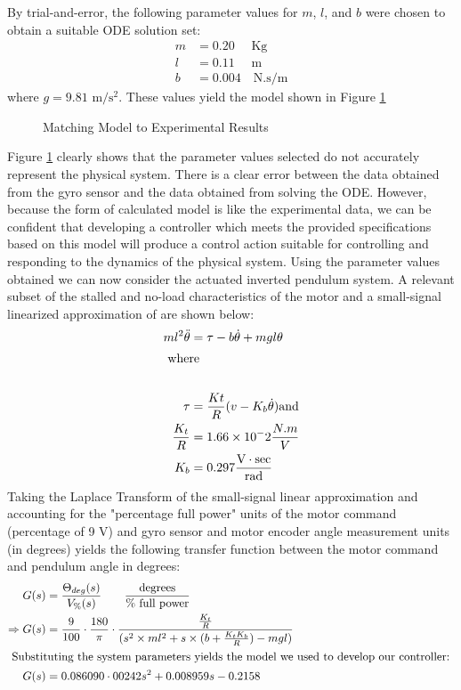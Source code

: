 \documentclass[11pt, a4paper,twocolumn]{article}
\begin{document}
By trial-and-error, the following parameter values for $m$, $l$, and $b$ were chosen to obtain a suitable ODE solution set:
\begin{align*}
	m &= 0.20\quad \text{ Kg}\\
	l &= 0.11\quad \text{ m}\\
	b &= 0.004\quad \text{N.s/m}
\end{align*}
where $ g = 9.81 \text{ m}/\text{s}^2 $. These values yield the model shown in Figure \ref{fig:damping_match}
\begin{figure}[hb!]
\centering
\caption{Matching Model to Experimental Results}
\label{fig:damping_match}
\end{figure}
	Figure \ref{fig:damping_match} clearly shows that the parameter values selected do not accurately represent the physical system. There is a clear error between the data obtained from the gyro sensor and the data obtained from solving the ODE. However, because the form of calculated model is like the experimental data, we can be confident that developing a controller which meets the provided specifications based on this model will produce a control action suitable for controlling and responding to the dynamics of the physical system.
Using the parameter values obtained we can now consider the actuated inverted pendulum system. A relevant subset of the stalled and no-load characteristics of the motor and a small-signal linearized approximation of are shown below:
%
\begin{align*}
	ml^2\ddot{\theta} &= \tau - b\dot{\theta} + mgl\theta \\
	\intertext{ where }	\\
	\tau &= \frac{Kt}{R}(v - K_b\dot{\theta}) \text{and}	\\
	\frac{K_t}{R} &= 1.66 \times 10^-2 \frac{N.m}{V}				\\
	K_b &= 0.297 \frac{\text{V}\cdot \text{sec}}{\text{rad}}\\
\end{align*}
	Taking the Laplace Transform of the small-signal linear approximation and accounting for the "percentage full power" units 	of the motor command (percentage of 9 V) and gyro sensor and motor encoder angle measurement units (in degrees) yields the following transfer function between the motor command and pendulum angle in degrees:
\begin{align*}
	G(s) &= \frac{\Theta_{deg}(s)}{V_\%(s)} \qquad \frac{\text{degrees}}{\text{\% full power}}	\\
	\Rightarrow G(s) &= \frac{9}{100}\cdot \frac{180}{\pi}\cdot \frac{\frac{K_t}{R}}{(s^2 \times ml^2 + s \times (b+ \frac{K_t 					K_b}{R}) - mgl)} \\
\intertext{
	Substituting the system parameters yields the model we used to develop our controller: 
}
	G(s) &= 0.086090\cdot 00242 s^2+ 0.008959 s - 0.2158
\end{align*}
\end{document}
